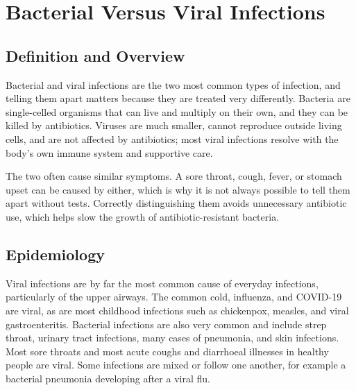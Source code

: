 \chapter{Bacterial Versus Viral Infections}

\section*{Definition and Overview}
Bacterial and viral infections are the two most common types of infection, and telling them apart matters because they are treated very differently. Bacteria are single-celled organisms that can live and multiply on their own, and they can be killed by antibiotics. Viruses are much smaller, cannot reproduce outside living cells, and are not affected by antibiotics; most viral infections resolve with the body's own immune system and supportive care.

The two often cause similar symptoms. A sore throat, cough, fever, or stomach upset can be caused by either, which is why it is not always possible to tell them apart without tests. Correctly distinguishing them avoids unnecessary antibiotic use, which helps slow the growth of antibiotic-resistant bacteria.

\section*{Epidemiology}
Viral infections are by far the most common cause of everyday infections, particularly of the upper airways. The common cold, influenza, and COVID-19 are viral, as are most childhood infections such as chickenpox, measles, and viral gastroenteritis. Bacterial infections are also very common and include strep throat, urinary tract infections, many cases of pneumonia, and skin infections. Most sore throats and most acute coughs and diarrhoeal illnesses in healthy people are viral. Some infections are mixed or follow one another, for example a bacterial pneumonia developing after a viral flu.

